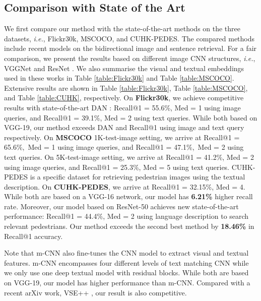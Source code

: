 \documentclass[10pt,final,journal]{IEEEtran}
\newcommand{\ie}{\mbox{\emph{i.e.}}}
\begin{document}
\subsection{Comparison with State of the Art} \label{sec:state}
We first compare our method with the state-of-the-art methods on the three datasets, \ie, Flickr30k, MSCOCO, and CUHK-PEDES. The compared methods include recent models on the bidirectional image and sentence retrieval. For a fair comparison, we present the results based on different image CNN structures, \ie, VGGNet \cite{simonyan2014very} and ResNet \cite{he2016deep}. We also summarise the visual and textual embeddings used in these works in Table \ref{table:Flickr30k} and Table \ref{table:MSCOCO}.  
Extensive results are shown in Table \ref{table:Flickr30k}, Table \ref{table:MSCOCO}, and Table \ref{table:CUHK}, respectively. 
On \textbf{Flickr30k}, we achieve competitive results with state-of-the-art DAN \cite{nam2016dual}: Recall@1 = 55.6\%, Med  = 1 using image queries, and Recall@1 = 39.1\%, Med  = 2 using text queries. While both based on VGG-19, our method exceeds DAN \textbf{} and \textbf{} Recall@1 using image and text query respectively.
On \textbf{MSCOCO} 1K-test-image setting, we arrive at Recall@1 = 65.6\%,~Med  = 1 using image queries, and Recall@1 = 47.1\%,~Med  = 2 using text queries. On 5K-test-image setting, we arrive at Recall@1 = 41.2\%, Med  = 2 using image queries, and Recall@1 = 25.3\%, Med  = 5 using text queries.
CUHK-PEDES is a specific dataset for retrieving pedestrian images using the textual description. On \textbf{CUHK-PEDES}, we arrive at Recall@1 = 32.15\%, Med  = 4. While both are based on a VGG-16 network, our model has \textbf{6.21\%} higher recall rate. Moreover, our model based on ResNet-50 achieves new state-of-the-art performance: Recall@1 = 44.4\%, Med  = 2 using language description to search relevant pedestrians. Our method exceeds the second best method \cite{li2017identity} by \textbf{18.46\%} in Recall@1 accuracy. 

Note that m-CNN \cite{ma2015multimodal} also fine-tunes the CNN model to extract visual and textual features. m-CNN encompasses four different levels of text matching CNN while we only use one deep textual model with residual blocks. While both are based on VGG-19, our model has higher performance than m-CNN. Compared with a recent arXiv work, VSE++ \cite{faghri2017vse++},  our result is also competitive.
\end{document}
